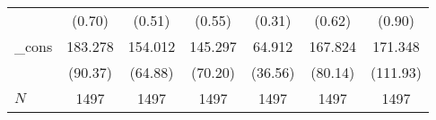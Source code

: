 {\begin{tabular}{l*{6}{c}}
            &                   (0.70)         &                   (0.51)         &                   (0.55)         &                   (0.31)         &                   (0.62)         &                   (0.90)         \\
\_cons      &                  183.278\sym{*}  &                  154.012\sym{*}  &                  145.297\sym{*}  &                   64.912         &                  167.824\sym{*}  &                  171.348         \\
            &                  (90.37)         &                  (64.88)         &                  (70.20)         &                  (36.56)         &                  (80.14)         &                 (111.93)         \\
\hline
\(N\)       &                     1497         &                     1497         &                     1497         &                     1497         &                     1497         &                     1497         \\
\hline\hline
\end{tabular}
}
